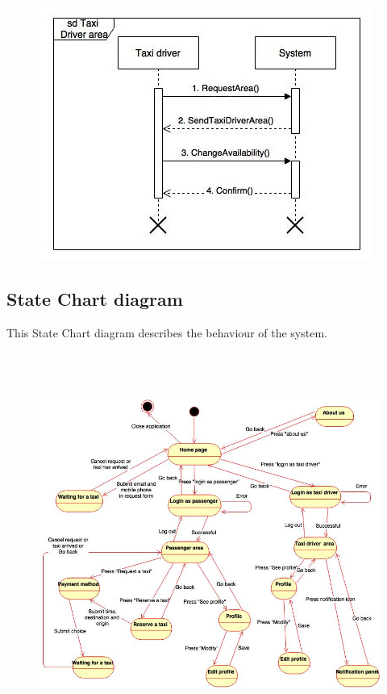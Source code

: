 \documentclass[18pt,oneside,a4paper, titlepage]{article}
\begin{document}
\begin{itemize}
				\newpage
				
				\begin{figure}[h]
					\centering
					\includegraphics[scale=1]{SequenceTaxiArea.jpg}
				\end{figure}
	\end{itemize}
\newpage
	\subsection{State Chart diagram}
		This State Chart diagram describes the behaviour of the system.
		\\ \\ \\ \\ 
		\begin{figure}[h]
			\centering
			\includegraphics[scale=0.5]{stateChartDiagram.jpg}
		\end{figure}
\end{document}
